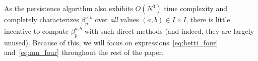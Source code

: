\documentclass[10pt]{article}
\numberwithin{equation}{section}
\newcommand{\+}{%
	\raisebox{0.18ex}{\scaleobj{0.55}{+}}
}
\theoremstyle{definition}
\theoremstyle{definition}
\begin{document}
As the persistence algorithm also exhibits $O(N^3)$ time complexity and completely characterizes $\beta_p^{a,b}$ over \emph{all} values $(a,b) \in I \times I$, there is little incentive to compute $\beta_p^{a,b}$ with such direct methods (and indeed, they are largely unused). Because of this, we will focus on expressions~\eqref{eq:betti_four} and~\eqref{eq:mu_four} throughout the rest of the paper.


\end{document}
